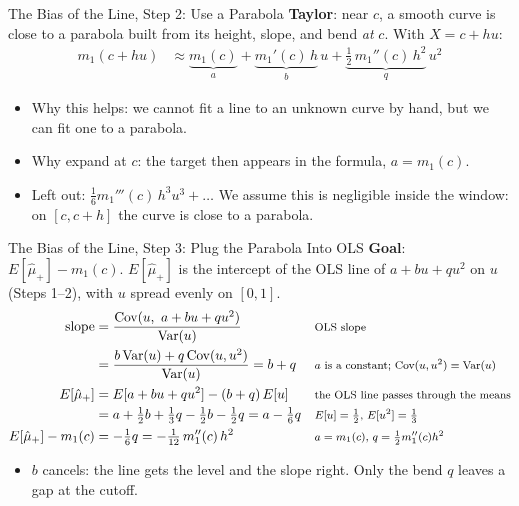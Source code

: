 \documentclass[aspectratio=169,11pt,xcolor=dvipsnames]{beamer}
\DeclareMathOperator{\Cov}{Cov}
\DeclareMathOperator{\Var}{Var}
\newcommand{\E}{E}
\begin{document}
\begin{frame}{The Bias of the Line, Step 2: Use a Parabola}
\textbf{Taylor}: near $c$, a smooth curve is close to a parabola built from its
height, slope, and bend \emph{at} $c$. With $X = c + hu$:
\begin{align*}
  m_1(c + hu) &\approx \underbrace{m_1(c)}_{a} + \underbrace{m_1'(c)\,h}_{b}\,u
     + \underbrace{\tfrac12\, m_1''(c)\,h^2}_{q}\,u^2
\end{align*}
\vskip-4pt
\begin{itemize}\itemsep2pt
  \item Why this helps: we cannot fit a line to an unknown curve by hand, but we
        can fit one to a parabola.
  \item Why expand at $c$: the target then appears in the formula, $a = m_1(c)$.
  \item Left out: $\tfrac16 m_1'''(c)\,h^3u^3 + \dots$ We assume this is negligible
        inside the window: on $[c, c+h]$ the curve is close to a parabola.
\end{itemize}
\end{frame}

\begin{frame}{The Bias of the Line, Step 3: Plug the Parabola Into OLS}
\textbf{Goal}: $\E[\hat\mu_+] - m_1(c)$. $\E[\hat\mu_+]$ is the intercept of the
OLS line of $a + bu + qu^2$ on $u$ (Steps 1--2), with $u$ spread evenly on $[0,1]$.
\begin{align*}
  \text{slope} &= \frac{\Cov(u,\ a + bu + qu^2)}{\Var(u)}
   && \text{\footnotesize OLS slope} \\
  &= \frac{b\Var(u) + q\Cov(u,u^2)}{\Var(u)} = b + q
   && \text{\footnotesize $a$ is a constant; $\Cov(u,u^2) = \Var(u)$} \\
  \E[\hat\mu_+] &= \E[a + bu + qu^2] - (b + q)\,\E[u]
   && \text{\footnotesize the OLS line passes through the means} \\
  &= a + \tfrac12 b + \tfrac13 q - \tfrac12 b - \tfrac12 q = a - \tfrac16 q
   && \text{\footnotesize $\E[u] = \tfrac12$, $\E[u^2] = \tfrac13$} \\
  \E[\hat\mu_+] - m_1(c) &= -\tfrac16 q = -\tfrac1{12}\,m_1''(c)\,h^2
   && \text{\footnotesize $a = m_1(c)$, $q = \tfrac12 m_1''(c)h^2$}
\end{align*}
\vskip-2pt
\begin{itemize}\itemsep2pt
  \item $b$ cancels: the line gets the level and the slope right. \alert{Only the bend
        $q$ leaves a gap at the cutoff.}
\end{itemize}
\end{frame}
\end{document}

